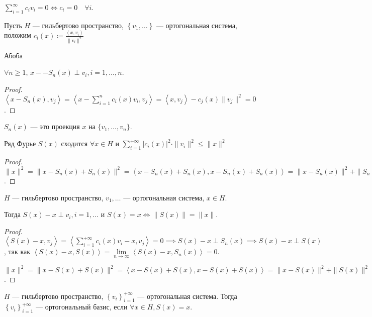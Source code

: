 \begin{remark}
    $\sum\limits_{i = 1}^{\infty} c_iv_i = 0\iff c_i = 0\quad \forall i$.
\end{remark}
Пусть $H$ --- гильбертово пространство, $\left\{ v_1, \ldots \right\}$ --- ортогональная система, положим $c_i\left( x \right) \coloneqq \frac{\left<x, v_i \right>}{\|v_i\|^2}$
\begin{definition}
    Абоба
\end{definition}
\begin{lemma}
    $\forall n \ge 1$, $x -- S_n(x) \perp v_i, i=1,\ldots, n$.
\end{lemma}
\begin{proof}
    $\left< x - S_n(x), v_j \right> = \left< x - \sum\limits_{i = 1}^n c_i(x)v_i, v_j \right> = \left<x, v_j \right> - c_j(x) \|v_j\|^2 = 0$.
\end{proof}
\begin{remark}
    $S_n(x)$ --- это проекция  $x$ на  $\{v_1, \ldots, v_n\}$.
\end{remark}
\begin{consequence}
    Ряд Фурье $S(x)$ сходится  $\forall x \in H$ и  $\sum\limits_{i=1}^{+\infty} |c_i(x)|^2\cdot \|v_i\|^2 \le  \|x\|^2$
\end{consequence}
\begin{proof}
    $\|x\|^2 = \|x - S_n(x) + S_n(x)\|^2 = \left<x - S_n(x) + S_n(x), x - S_n(x) + S_n(x) \right> = \|x-S_n(x)\|^2 + \|S_n(x)\|^2 \implies \|S_n(x)\|^2 \le  \|x\|^2$.
\end{proof}
\begin{theorem}
    $H$ --- гильбертово пространство, $v_1, \ldots$ --- ортогональная система, $x \in H$.

    Тогда $S(x) - x \perp v_i, i = 1, \ldots$ и $S(x) = x \iff \|S\left(x \right) \| = \|x\|$.
\end{theorem}
\begin{proof}
    $\left<S(x) - x, v_j \right> = \left<\sum\limits_{i = 1}^{+\infty}c_i(x) v_i - x, v_j \right> = 0 \implies S(x) - x \perp S_n(x) \implies S(x) - x \perp S(x)$, так как $\left<S(x) - x, S(x) \right> = \lim\limits_{n \to \infty} \left<S(x) - x, S_n(x) \right> = 0$.

    $\|x\|^2 = \|x-S(x) + S(x)\|^2 = \left< x-S(x) + S(x), x - S(x) + S(x) \right> = \|x-S(x)\|^2 + \|S(x)\|^2 \implies \|x\|^2 = \|S(x)\|^2 \iff \|x-S(x)\|^2 = 0$.
\end{proof}
\begin{definition}
    $H$ --- гильбертово пространство,  $\left\{ v_i \right\}_{i=1}^{+\infty}$ --- ортогональная система. Тогда $\left\{ v_i \right\}_{i=1}^{+\infty}$ --- ортогональный базис, если $\forall x \in H, S(x) = x$.
\end{definition}
